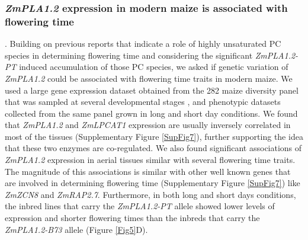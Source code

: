 \documentclass[9pt,twocolumn,twoside,lineno]{BioRxiv}
\begin{document}
\subsubsection{\textit{ZmPLA1.2} expression in modern maize is associated with flowering time}. 
Building on previous reports that indicate a role of highly unsaturated PC species in determining flowering time \cite{Nakamura2014-qf, Riedelsheimer2013-bd} and considering the significant \textit{ZmPLA1.2-PT} induced accumulation of those PC species, we asked if genetic variation of \textit{ZmPLA1.2} could be associated with flowering time traits in modern maize. 
We used a large gene expression dataset obtained from the 282 maize diversity panel that was sampled at several developmental stages \cite{Kremling2018-gn}, and phenotypic datasets collected from the same panel grown in long and short day conditions. 
We found that \textit{ZmPLA1.2} and \textit{ZmLPCAT1} expression are usually inversely correlated in most of the tissues (Supplementary Figure \ref{SupFig7}), further supporting the idea that these two enzymes are co-regulated. 
We also found significant associations of \textit{ZmPLA1.2} expression in aerial tissues similar with several flowering time traits. 
The magnitude of this associations is similar with other well known genes that are involved in determining flowering time (Supplementary Figure \ref{SupFig7}) like \textit{ZmZCN8} and \textit{ZmRAP2.7}.
Furthermore, in both long and short days conditions, the inbred lines that carry the \textit{ZmPLA1.2-PT} allele showed lower levels of expression and shorter flowering times than the inbreds that carry the \textit{ZmPLA1.2-B73} allele  (Figure \ref{Fig5}D). 
\end{document}
